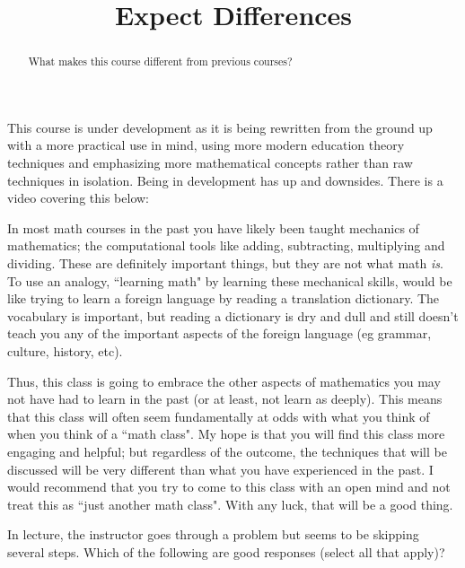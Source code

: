 \documentclass{ximera}
\title{Expect Differences}
\begin{document}
\begin{abstract}
What makes this course different from previous courses?
\end{abstract}
\maketitle
This course is under development as it is being rewritten from the ground up with a more practical use in mind, using more modern education theory techniques and emphasizing more mathematical concepts rather than raw techniques in isolation. Being in development has up and downsides. There is a video covering this below:


In most math courses in the past you have likely been taught mechanics of mathematics; the computational tools like adding, subtracting, multiplying and dividing. These are definitely important things, but they are not what math \textit{is}. To use an analogy, ``learning math" by learning these mechanical skills, would be like trying to learn a foreign language by reading a translation dictionary. The vocabulary is important, but reading a dictionary is dry and dull and still doesn't teach you any of the important aspects of the foreign language (eg grammar, culture, history, etc).

Thus, this class is going to embrace the other aspects of mathematics you may not have had to learn in the past (or at least, not learn as deeply). This means that this class will often seem fundamentally at odds with what you think of when you think of a ``math class". My hope is that you will find this class more engaging and helpful; but regardless of the outcome, the techniques that will be discussed will be very different than what you have experienced in the past. I would recommend that you try to come to this class with an open mind and not treat this as ``just another math class". With any luck, that will be a good thing.


\begin{question}
    In lecture, the instructor goes through a problem but seems to be skipping several steps. Which of the following are good responses (select all that apply)?
    \begin{selectAll}
    \end{selectAll}
\end{question}
\end{document}
